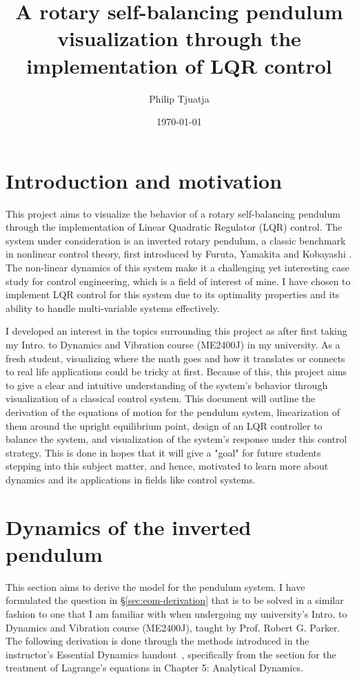 \documentclass[12pt]{article}
\title{A rotary self-balancing pendulum visualization through the implementation of LQR control}
\author{Philip Tjuatja}
\date{\today}
\begin{document}
\vspace{15pt}
\maketitle
\newpage
\tableofcontents
\newpage

\section{Introduction and motivation}

This project aims to visualize the behavior of a rotary self-balancing pendulum through the implementation of Linear Quadratic Regulator (LQR) control. The system under consideration is an inverted rotary pendulum, a classic benchmark in nonlinear control theory, first introduced by Furuta, Yamakita and Kobayashi \cite{Furuta1992PseudoState}. The non-linear dynamics of this system make it a challenging yet interesting case study for control engineering, which is a field of interest of mine. I have chosen to implement LQR control for this system due to its optimality properties and its ability to handle multi-variable systems effectively. 

I developed an interest in the topics surrounding this project as after first taking my Intro. to Dynamics and Vibration course (ME2400J) in my university. As a fresh student, visualizing where the math goes and how it translates or connects to real life applications could be tricky at first. Because of this, this project aims to give a clear and intuitive understanding of the system's behavior through visualization of a classical control system. This document will outline the derivation of the equations of motion for the pendulum system, linearization of them around the upright equilibrium point, design of an LQR controller to balance the system, and visualization of the system's response under this control strategy. This is done in hopes that it will give a "goal" for future students stepping into this subject matter, and hence, motivated to learn more about dynamics and its applications in fields like control systems.

\section{Dynamics of the inverted pendulum}

This section aims to derive the model for the pendulum system. I have formulated the question in \S \ref{sec:eom-derivation} that is to be solved in a similar fashion to one that I am familiar with when undergoing my university's Intro. to Dynamics and Vibration course (ME2400J), taught by Prof. Robert G. Parker. The following derivation is done through the methods introduced in the instructor's Essential Dynamics handout~\cite{Parker2026Essential}, specifically from the section for the treatment of Lagrange's equations in Chapter 5: Analytical Dynamics.
\end{document}
